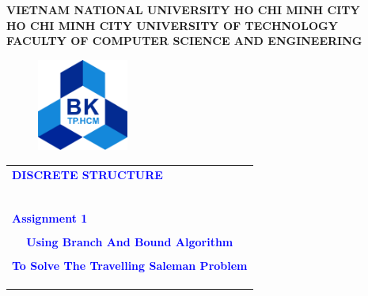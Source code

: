 \documentclass[a4paper]{article}
\begin{document}
\begin{titlepage}
\begin{center}
\textbf{\Large VIETNAM NATIONAL UNIVERSITY HO CHI MINH CITY} \\

\vspace{7pt}
\textbf{\Large HO CHI MINH CITY UNIVERSITY OF TECHNOLOGY} \\

\vspace{7pt}
\textbf{\Large FACULTY OF COMPUTER SCIENCE AND ENGINEERING}
\end{center}

\vspace{1cm}

\begin{figure}[h!]
\begin{center}
\includegraphics[width=3cm]{Images/hcmut.png}
\end{center}
\end{figure}

\vspace{1cm}


\begin{center}
\begin{tabular}{ccc}
	\multicolumn{3}{l}{\textbf{{\Large \textcolor{blue}{DISCRETE STRUCTURE}}}}\\
	~~\\
	\arrayrulecolor{blue}\hline
	\\
	\multicolumn{3}{l}{\textbf{{\Large \textcolor{blue}{Assignment 1} }}}\\
	\\
	
	\multicolumn{3}{c}{\textbf{{\huge \textcolor{blue}{Using Branch And Bound Algorithm}}}}\\
	\\
    
    \multicolumn{3}{c}{\textbf{{\huge \textcolor{blue}{To Solve The Travelling Saleman Problem}}}}\\
	\\
	\arrayrulecolor{blue}\hline \\ \\


\end{tabular}
\end{center}
\end{titlepage}
\end{document}
